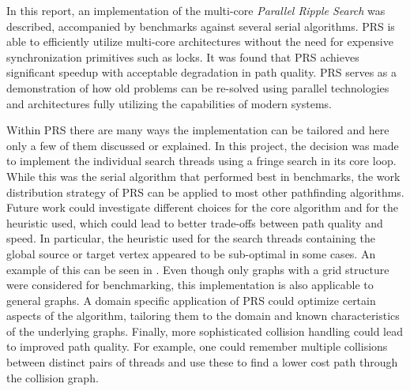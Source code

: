 In this report, an implementation of the multi-core \textit{Parallel Ripple Search} was described, accompanied by benchmarks against several serial algorithms. 
PRS is able to efficiently utilize multi-core architectures without the need for expensive synchronization primitives such as locks.
It was found that PRS achieves significant speedup with acceptable degradation in path quality. 
PRS serves as a demonstration of how old problems can be re-solved using parallel technologies and architectures fully utilizing the capabilities of modern systems.

Within PRS there are many ways the implementation can be tailored and here only a few of them discussed or explained.
In this project, the decision was made to implement the individual search threads using a fringe search in its core loop. 
While this was the serial algorithm that performed best in benchmarks, the work distribution strategy of PRS can be applied to most other pathfinding algorithms.
Future work could investigate different choices for the core algorithm and for the heuristic used, which could lead to better trade-offs between path quality and speed. 
In particular, the heuristic used for the search threads containing the global source or target vertex appeared to be sub-optimal in some cases. An example of this can be seen in .
Even though only graphs with a grid structure were considered for benchmarking, this implementation is also applicable to general graphs. 
A domain specific application of PRS could optimize certain aspects of the algorithm, tailoring them to the domain and known characteristics of the underlying graphs.
Finally, more sophisticated collision handling could lead to improved path quality. For example, one could remember multiple collisions between distinct pairs of threads and use these to find a lower cost path through the collision graph.

